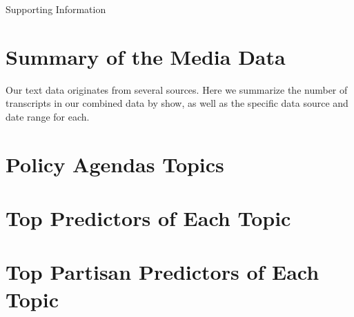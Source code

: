 \documentclass[12pt, letterpaper]{article}
\begin{document}
\clearpage




\clearpage
\appendix
\renewcommand{\thesection}{SI \arabic{section}}
\renewcommand\thetable{\thesection.\arabic{table}}  
\renewcommand\thefigure{\thesection.\arabic{figure}}


\begin{center}
\Large{Supporting Information}
\end{center}


\section{Summary of the Media Data}
\label{si1}
Our text data originates from several sources. Here we summarize the number of transcripts in our combined data by show, as well as the specific data source and date range for each.
\scriptsize


\clearpage
\section{Policy Agendas Topics}
\label{si2}


\clearpage
\section{Top Predictors of Each Topic}
\label{si_top20}

\clearpage


\clearpage
\section{Top Partisan Predictors of Each Topic}

\end{document}
